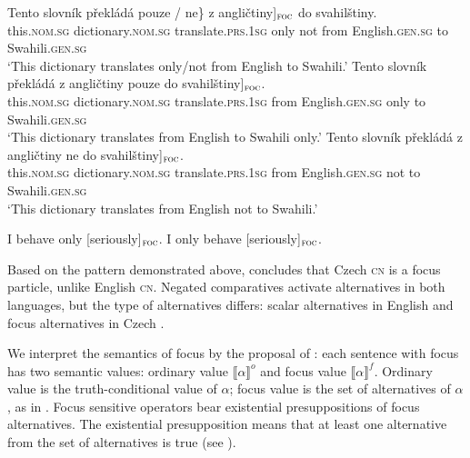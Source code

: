 \documentclass[output=paper,
]{langscibook}
\begin{document}
\ea \label{ex:only_c}
 \ea \gll Tento slovník překládá \minsp{\{} pouze / ne\} \minsp{[} z angličtiny]$_{\textsc{foc}}$ do svahilštiny.\\
    this.\textsc{nom.sg} dictionary.\textsc{nom.sg} translate.\textsc{prs.1sg} {} only {} not {} from English.\textsc{gen.sg} to Swahili.\textsc{gen.sg}\\
    \glt `This dictionary translates only/not from English to Swahili.'
\ex 
    \gll Tento slovník překládá z angličtiny pouze \minsp{[} do svahilštiny]$_{\textsc{foc}}$.\\
    this.\textsc{nom.sg} dictionary.\textsc{nom.sg} translate.\textsc{prs.1sg} from English.\textsc{gen.sg} only {} to Swahili.\textsc{gen.sg}\\
    \glt `This dictionary translates from English to Swahili only.' \label{ex:only_c_2}
\ex 
    \gll Tento slovník překládá z angličtiny ne \minsp{[} do svahilštiny]$_{\textsc{foc}}$.\\
    this.\textsc{nom.sg} dictionary.\textsc{nom.sg} translate.\textsc{prs.1sg} from English.\textsc{gen.sg} not {} to Swahili.\textsc{gen.sg}\\
    \glt `This dictionary translates from English not to Swahili.' \label{ex:only_c_3}
\z
\z


\ea \label{ex:only_e}
	\ea I behave only [seriously]$_{\textsc{foc}}$.
    \ex I only behave [seriously]$_{\textsc{foc}}$.\hfill\citep{dovcekal2017upper}
\z
\z


\noindent Based on the pattern demonstrated above, \cite{dovcekal2017upper} concludes that Czech \textsc{cn} is a focus particle, unlike English \textsc{cn}. Negated comparatives activate alternatives in both languages, but the type of alternatives differs: scalar alternatives in English \citep{nouwen2008upper} and focus alternatives in Czech \citep{dovcekal2017upper}. 

We interpret the semantics of focus by the proposal of \cite{rooth1985association,rooth1992theory}: each sentence with focus has two semantic values: ordinary value $\llbracket \alpha
 \rrbracket^{o}$ and focus value $\llbracket \alpha \rrbracket^{f}$. Ordinary value is the truth-conditional value of $\alpha$; focus value is the set of alternatives of $\alpha$, as in . Focus sensitive operators bear existential presuppositions of focus alternatives. The existential presupposition means that at least one alternative from the set of alternatives is true (see \citealt{rooth1985association,rooth1992theory}).
 
\end{document}
